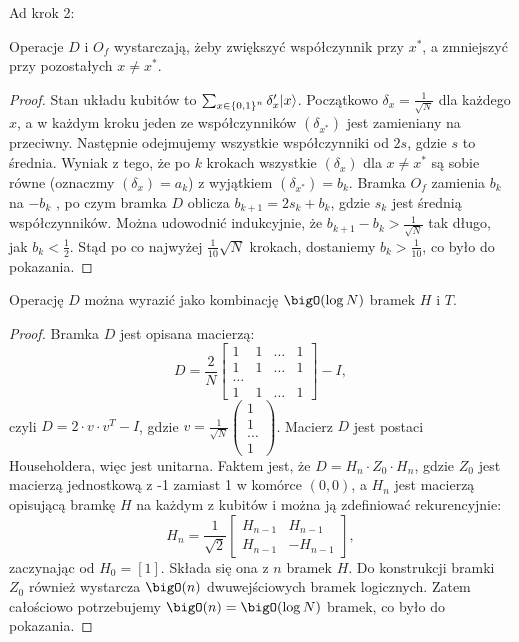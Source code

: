 Ad krok 2:
\begin{proposition}
    Operacje \( D \) i \( O_f \) wystarczają, żeby zwiększyć współczynnik przy \( x^{*} \), a zmniejszyć przy pozostałych \( x \neq x^{*} \).
\end{proposition}
\begin{proof}
    Stan układu kubitów to \( \sum_{x \in \set{0,1}^n} \delta'_x |x\rangle \). Początkowo \( \delta_x = \frac{1}{\sqrt{N}} \) dla każdego \( x \),
    a w każdym kroku jeden ze współczynników \( (\delta_{x^{*}}) \) jest zamieniany na przeciwny. Następnie odejmujemy wszystkie współczynniki od \( 2s \), gdzie \( s \) to średnia.
    Wyniak z tego, że po \( k \) krokach wszystkie \( (\delta_x) \) dla \( x \neq x^{*} \) są sobie równe (oznaczmy \( (\delta_x) = a_k \)) z wyjątkiem \( (\delta_{x^{*}}) = b_k \).
    Bramka \( O_f \) zamienia \( b_k \) na \( -b_k \) , po czym bramka \( D \) oblicza \( b_{k+1} = 2s_k + b_k \), gdzie \( s_k \) jest średnią współczynników.
    Można udowodnić indukcyjnie, że \( b_{k+1} - b_k > \frac{1}{\sqrt{N}} \) tak długo, jak \( b_k < \frac{1}{2} \).
    Stąd po co najwyżej \( \frac{1}{10} \sqrt{N} \) krokach, dostaniemy \( b_k > \frac{1}{10} \), co było do pokazania.
\end{proof}
\begin{proposition}
    Operację \( D \) można wyrazić jako kombinację \( \bigO(\log N) \) bramek \( H \) i \( T \).
\end{proposition}
\begin{proof}
    Bramka \( D \) jest opisana macierzą:
    \[
        D = \frac{2}{N}
        \begin{bmatrix}
        1 & 1 & \ldots & 1 \\
        1 & 1 & \ldots & 1 \\
        \ldots \\
        1 & 1 & \ldots & 1
        \end{bmatrix}
        - I,
    \]
    czyli \( D = 2 \cdot v \cdot v^T - I \), gdzie \( v = \frac{1}{\sqrt{N}}
    \begin{pmatrix}
    1 \\
    1 \\
    \ldots \\
    1
    \end{pmatrix} \).
    Macierz \( D \) jest postaci Householdera, więc jest unitarna. Faktem jest, że \( D = H_n \cdot Z_0 \cdot H_n \), gdzie \( Z_0 \) jest macierzą jednostkową z -1 zamiast 1 w komórce \( (0,0) \),
    a \( H_n \) jest macierzą opisującą bramkę \( H \) na każdym z kubitów i można ją zdefiniować rekurencyjnie:
    \[
        H_n = \frac{1}{\sqrt{2}}
        \begin{bmatrix}
        H_{n-1} & H_{n-1} \\
        H_{n-1} & -H_{n-1}
        \end{bmatrix},
    \]
    zaczynając od \( H_0 = [1] \). Składa się ona z \( n \) bramek \( H \). Do konstrukcji bramki \( Z_0 \) również wystarcza \( \bigO(n) \) dwuwejściowych bramek logicznych.
    Zatem całościowo potrzebujemy \( \bigO(n) = \bigO(\log N) \) bramek, co było do pokazania.
\end{proof}